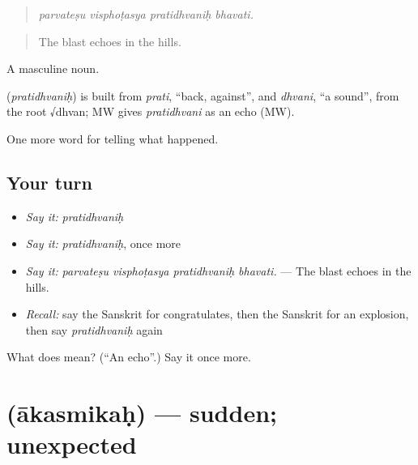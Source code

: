 \begin{quote}
\emph{parvateṣu visphoṭasya pratidhvaniḥ bhavati.}
\end{quote}

\begin{quote}
The blast echoes in the hills.
\end{quote}

A masculine noun.

\begin{cousinweb}
\textbf{} (\emph{pratidhvaniḥ}) is built from \emph{prati}, \textquotedblleft{}back, against\textquotedblright{}, and \emph{dhvani}, \textquotedblleft{}a sound\textquotedblright{}, from the root √dhvan; MW gives \emph{pratidhvani} as an echo (MW).
\end{cousinweb}

\begin{grammarlens}[title={What you've built}]
One more word for telling what happened.
\end{grammarlens}

\subsection*{Your turn}
\begin{itemize}
\raggedright
  \item \emph{Say it:} \emph{pratidhvaniḥ}
  \item \emph{Say it:} \emph{pratidhvaniḥ}, once more
  \item \emph{Say it:} \emph{parvateṣu visphoṭasya pratidhvaniḥ bhavati.} — The blast echoes in the hills.
  \item \emph{Recall:} say the Sanskrit for congratulates, then the Sanskrit for an explosion, then say \emph{pratidhvaniḥ} again
\end{itemize}

\begin{tcolorbox}[breakable,colback=teal!4,colframe=teal!35!black,title={Before you move on}]
What does  mean? (\textquotedblleft{}An echo\textquotedblright{}.) Say it once more.
\end{tcolorbox}
\section[\texorpdfstring{\sk{आकस्मिकः} (ākasmikaḥ)}{आकस्मिकः (ākasmikaḥ)}]{ (ākasmikaḥ) — sudden; unexpected}

\label{lesson:SA-C315-akasmikah}



